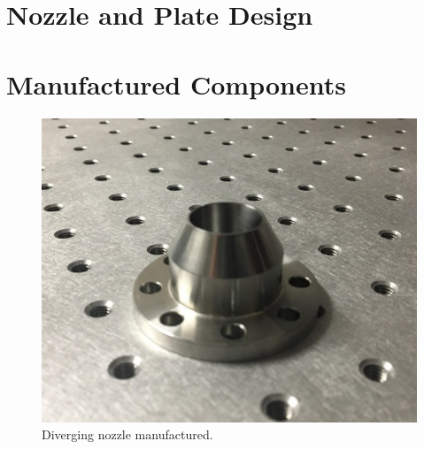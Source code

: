 \section{Nozzle and Plate Design} \label{app:drawings}











\section{Manufactured Components} \label{app:manufactured}

\begin{figure}[H] 
	\centering
	\includegraphics[scale=1.2]{fig11.PNG} 
	\caption{Diverging nozzle manufactured.}
	\label{fig:11}
\end{figure}


